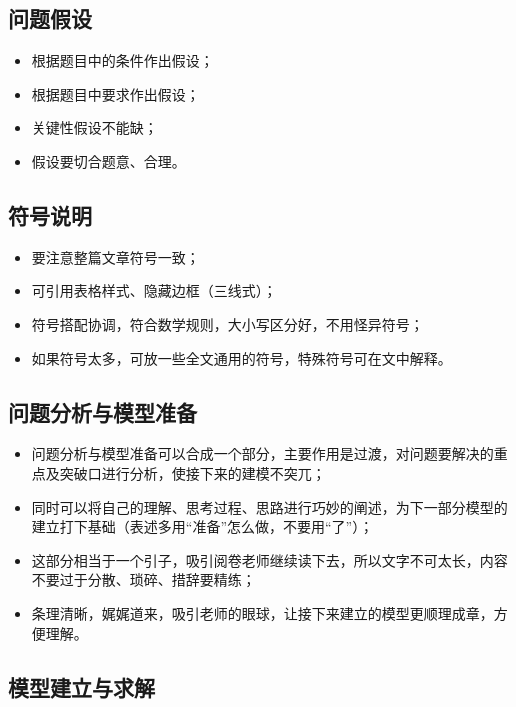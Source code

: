 \documentclass[openany]{progbookcn}
\begin{document}
\subsection{问题假设}
\begin{itemize}
    \item 根据题目中的条件作出假设；
    \item 根据题目中要求作出假设；
    \item 关键性假设不能缺；
    \item 假设要切合题意、合理。
\end{itemize}
\subsection{符号说明}
\begin{itemize}
    \item 要注意整篇文章符号一致；
    \item 可引用表格样式、隐藏边框（三线式）；
    \item 符号搭配协调，符合数学规则，大小写区分好，不用怪异符号；
    \item 如果符号太多，可放一些全文通用的符号，特殊符号可在文中解释。
\end{itemize}
\subsection{问题分析与模型准备}
\begin{itemize}
    \item 问题分析与模型准备可以合成一个部分，主要作用是过渡，对问题要解决的重点及突破口进行分析，使接下来的建模不突兀；
    \item 同时可以将自己的理解、思考过程、思路进行巧妙的阐述，为下一部分模型的建立打下基础（表述多用“准备”怎么做，不要用“了”）；
    \item 这部分相当于一个引子，吸引阅卷老师继续读下去，所以文字不可太长，内容不要过于分散、琐碎、措辞要精练；
    \item 条理清晰，娓娓道来，吸引老师的眼球，让接下来建立的模型更顺理成章，方便理解。
\end{itemize}
\subsection{模型建立与求解}
\end{document}
